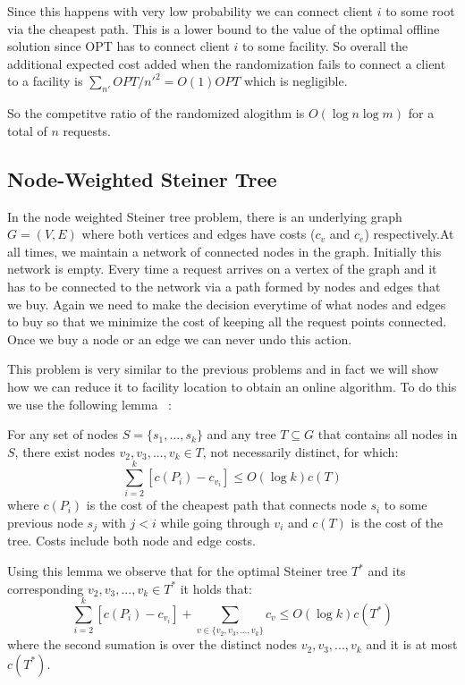 Since this happens with very low probability we can connect client $i$ to some root via the cheapest path. This is a lower bound to the value of the optimal offline solution since OPT has to connect client $i$ to some facility. So overall the additional expected cost added when the randomization fails to connect a client to a facility is $\sum_{n'} OPT/n'^2 = O(1) OPT$ which is negligible.

So the competitve ratio of the randomized alogithm is $O(\log n \log m)$ for a total of $n$ requests.

\subsection{Node-Weighted Steiner Tree}

In the node weighted Steiner tree problem, there is an underlying graph $G=(V,E)$ where both vertices and edges have costs ($c_v$ and $c_e$) respectively.At all times, we maintain a network of connected nodes in the graph. Initially this network is empty. Every time a request arrives on a vertex of the graph and it has to be connected to the network via a path formed by nodes and edges that we buy. Again we need to make the decision everytime of what nodes and edges to buy so that we minimize the cost of keeping all the request points connected. Once we buy a node or an edge we can never undo this action.

This problem is very similar to the previous problems and in fact we will show how we can reduce it to facility location to obtain an online algorithm. To do this we use the following lemma ~\cite{naor11:node-weighted-steiner-tree}:

\begin{lemma}
For any set of nodes $S = \{s_1,...,s_k\}$ and any tree $T \subseteq G$ that contains all nodes in $S$, 
there exist nodes $v_2, v_3, ... , v_k \in T$, not necessarily distinct, for which:
\[ \sum_{i=2}^k [c(P_i) - c_{v_i}] \le O(\log k) c(T) \]
where $c(P_i)$ is the cost of the cheapest path that connects node $s_i$ to some previous node $s_j$ with $j<i$ while going through $v_i$ and $c(T)$ is the cost of the tree. Costs include both node and edge costs.
\end{lemma}

Using this lemma we observe that for the optimal Steiner tree $T^*$ and its corresponding $v_2, v_3, ... , v_k \in T^*$ it holds that:
\[ \sum_{i=2}^k [c(P_i) - c_{v_i}] + \sum_{v \in \{v_2, v_3, ... , v_k\}} c_{v} \le O(\log k) c(T^*) \]
where the second sumation is over the distinct nodes $v_2, v_3, ... , v_k$ and it is at most $c(T^*)$.


